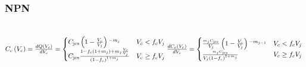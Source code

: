 \documentclass{article}
\begin{document}
\subsubsection{NPN}
\\
\begin{math}
C_c\left(V_c\right)=\frac{dQ\left(V_c\right)}{dV_c}=\begin{cases}
 C_{\text{jcs}}\left(1-\frac{V_c}{V_j}\right){}^{-m_j} & V_c<f_cV_j \\
 C_{\text{jcs}}\frac{1-f_c\left(1+m_j\right)+m_j\frac{V_c}{V_j}}
 {\left(1-f_c\right){}^{1+m_j}} & V_c\geq f_cV_j
\end{cases}\\
\frac{dC_c\left(V_c\right)}{dV_c}=\begin{cases}
 \frac{\text{}_{m_jC_{\text{jcs}}}}{V_j}\left(1-\frac{V_c}{V_j}\right){}^{-m_{j-1}} & V_c<f_cV_j \\
 \frac{\text{}_{m_jC_{\text{jcs}}}}{V_j\left(1-f_c\right){}^{1+m_j}} & V_c\geq f_cV_j
\end{cases}\\
\end{math}
\end{document}
